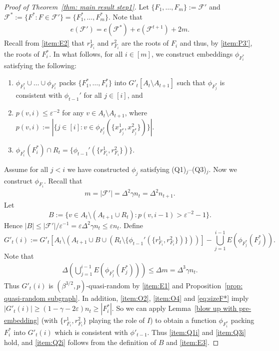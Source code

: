 \documentclass[a4paper, 11pt, reqno]{amsart}
\numberwithin{equation}{section}
\newcommand{\1}{{\rm 1\hspace*{-0.4ex}%
\rule{0.1ex}{1.52ex}\hspace*{0.2ex}}}
\newcommand{\cF}{\mathcal{F}}
\renewcommand{\epsilon}{\varepsilon}
\newcommand{\sm}{\setminus}
\newcounter{step}
\begin{document}
\begin{proof}[Proof of Theorem~\ref{thm: main result step1}]
Let $\{F_1,\dots, F_{m}\}:= \cF'$
and $\cF^*:=\{F^*:F\in \cF'\}=\{F_1^*,\ldots,F_m^*\}$.
Note that 
\begin{align}\label{eq:sizeF'}
	e(\cF')=e(\cF^*)+e(\cF^{t+1})+2m.
\end{align}
Recall from \ref{item:E2} that $r_{F_i}^1$ and $r_{F_i}^2$ are the roots of $F_i$ and thus,
by \ref{item:P3'}, the roots of $F_i^*$.
In what follows,
for all $i\in [m]$, we construct embeddings $\phi_{F_i^*}$  satisfying
the following:
\begin{enumerate}[label=(Q\arabic*)$_{i}$]
	\item\label{item:Q1i} $\phi_{F_1^*}\cup \dots \cup \phi_{F_{i}^*}$ packs $\{F_1^*,\dots, F_{i}^*\}$ into $G'_t[A_t\setminus A_{t+1}]$ 
	such that $\phi_{F_j^*}$ is consistent with $\phi_{t-1}'$ for all $j\in [i]$, and
	\item\label{item:Q2i} $p(v,i) \leq \epsilon^{-2}$ for any $v\in A_t\sm A_{t+1}$, where $p(v,i):=|\{ j\in[ i]: v\in \phi_{F_j^*}(\{x^{1}_{F_j^*},x^{2}_{F_j^*}\})\}|.$ 
	\item\label{item:Q3i} $\phi_{F_i^*}(F_i^*)\cap R_t = \{\phi_{t-1}'(\{r_{F_i}^1,r_{F_i}^2\})\}$.
\end{enumerate}
Assume for all $j<i$ we have constructed $\phi_j$ satisfying (Q1)$_j$--(Q3)$_j$.
Now we construct $\phi_{F_i}$.
Recall that 
\begin{align}\label{eq:sizeF'2}
	m=|\cF'|=\Delta^2 \gamma n_t=\Delta^2 n_{t+1}.
\end{align}
Let 
$$B:=\{ v \in A_t\sm (A_{t+1}\cup R_t) : p(v,i-1) > \epsilon^{-2}-1\}.$$ 
Hence $|B|\leq |\cF'|/\epsilon^{-1} =\epsilon\Delta^2 \gamma n_t \leq \epsilon n_t$. 
Define
$$G'_t(i):= G'_t[A_t\setminus (A_{t+1}\cup B \cup (R_t\sm \{\phi_{t-1}'(\{r_{F_i}^1,r_{F_i}^2\}) \}))]  - \bigcup_{j=1}^{i-1} E( \phi_{F_j^*}(F_j^*)).$$ 
Note that 
\begin{align}\label{eq:maxdeg}
	\Delta( \bigcup_{j=1}^{i-1} E( \phi_{F_j^*}(F_j^*))) 
	\leq \Delta m 
	= \Delta^3 \gamma n_t.
\end{align}
Thus $G'_t(i)$ is $(\beta^{3/2},p)$-quasi-random by \ref{item:E1} and Proposition~\ref{prop: quasi-random subgraph}.
In addition, 
\ref{item:O2}, \ref{item:O4} and \eqref{eq:sizeF*} imply 
$|G'_t(i)|\geq (1-\gamma-2\epsilon) n_{t} \geq |F_i^*|$.
So we can apply Lemma~\ref{blow up with pre-embedding} (with $\{r_{F_i}^1,r_{F_i}^2\}$ playing the role of $I$) to obtain a function $\phi_{F_i^*}$ packing $F_i^*$ into $G'_t(i)$ 
which is consistent with $\phi'_{t-1}$.
Thus \ref{item:Q1i} and \ref{item:Q3i} hold,
and \ref{item:Q2i} follows from the definition of $B$ and \ref{item:E3}.


\end{proof}
\end{document}
